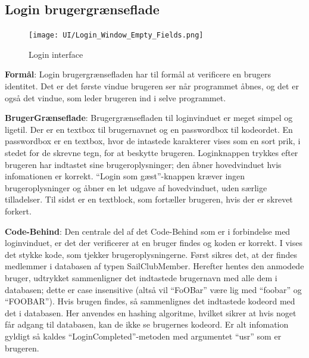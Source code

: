 \subsection{Login brugergrænseflade}
\begin{figure}
    \label{img:login_interface}
    \vspace{-20pt}
    \begin{center}
        \texttt{[image: UI/Login\_Window\_Empty\_Fields.png]}
    \end{center}
    \vspace{-15pt}
    \caption{Login interface}
\end{figure}
 
\textbf{Formål}: 
Login brugergrænsefladen har til formål at verificere en brugers identitet. 
Det er det første vindue brugeren ser når programmet åbnes, og det er også det vindue, som leder brugeren ind i selve programmet.
 
\textbf{BrugerGrænseflade}: 
Brugergrænsefladen til loginvinduet er meget simpel og ligetil. 
Der er en textbox til brugernavnet og en passwordbox til kodeordet.
En passwordbox er en textbox, hvor de intastede karakterer vises som en sort prik, i stedet for de skrevne tegn, for at beskytte brugeren.
Loginknappen trykkes efter brugeren har indtastet sine brugeroplysninger; den åbner hovedvinduet hvis infomationen er korrekt.
``Login som gæst''-knappen kræver ingen brugeroplysninger og åbner en let udgave af hovedvinduet, uden særlige tilladelser.
Til sidst er en textblock, som fortæller brugeren, hvis der er skrevet forkert.
 
\textbf{Code-Behind}: 
Den centrale del af det Code-Behind som er i forbindelse med loginvinduet, er det der verificerer at en bruger findes og koden er korrekt.
I  vises det stykke kode, som tjekker brugeroplysningerne.
Først sikres det, at der findes medlemmer i databasen af typen SailClubMember.
Herefter hentes den anmodede bruger, udtrykket sammenligner det indtastede brugernavn med alle dem i databasen; dette er case insensitive (altså vil ``FoOBar'' være lig med ``foobar'' og ``FOOBAR'').
Hvis brugen findes, så sammenlignes det indtastede kodeord med det i databasen. 
Her anvendes en hashing algoritme, hvilket sikrer at hvis noget får adgang til databasen, kan de ikke se brugernes kodeord.
Er alt infomation gyldigt så kaldes ``LoginCompleted''-metoden med argumentet ``usr'' som er brugeren. 
 
